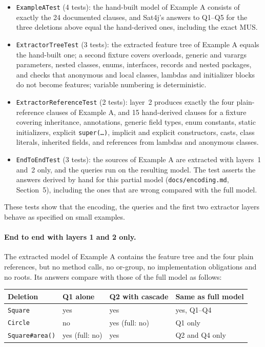 \documentclass[11pt,a4paper]{article}
\newcommand{\code}[1]{\texttt{#1}}
\begin{document}
\begin{itemize}
  \item \code{ExampleATest} (4 tests): the hand-built model of Example A
        consists of exactly the 24 documented clauses, and Sat4j's answers to
        Q1--Q5 for the three deletions above equal the hand-derived ones,
        including the exact MUS.
  \item \code{ExtractorTreeTest} (3 tests): the extracted feature tree of
        Example A equals the hand-built one; a second fixture covers
        overloads, generic and varargs parameters, nested classes, enums,
        interfaces, records and nested packages, and checks that anonymous
        and local classes, lambdas and initializer blocks do not become
        features; variable numbering is deterministic.
  \item \code{ExtractorReferenceTest} (2 tests): layer~2 produces exactly the
        four plain-reference clauses of Example A, and 15 hand-derived
        clauses for a fixture covering inheritance, annotations, generic
        field types, enum constants, static initializers, explicit
        \code{super(\dots)}, implicit and explicit constructors, casts,
        class literals, inherited fields, and references from lambdas and
        anonymous classes.
  \item \code{EndToEndTest} (3 tests): the sources of Example A are
        extracted with layers~1 and~2 only, and the queries run on the
        resulting model. The test asserts the answers derived by hand for
        this partial model (\code{docs/encoding.md}, Section~5), including
        the ones that are wrong compared with the full model.
\end{itemize}

These tests show that the encoding, the queries and the first two
extractor layers behave as specified on small examples.

\paragraph{End to end with layers 1 and 2 only.}
The extracted model of Example A contains the feature tree and the four
plain references, but no method calls, no or-group, no implementation
obligations and no roots. Its answers compare with those of the full model
as follows:

\begin{center}
\begin{tabular}{@{}llll@{}}
\toprule
Deletion & Q1 alone & Q2 with cascade & Same as full model \\
\midrule
\code{Square} & yes & yes & yes, Q1--Q4 \\
\code{Circle} & no & yes (full: no) & Q1 only \\
\code{Square\#area()} & yes (full: no) & yes & Q2 and Q4 only \\
\bottomrule
\end{tabular}
\end{center}
\end{document}
